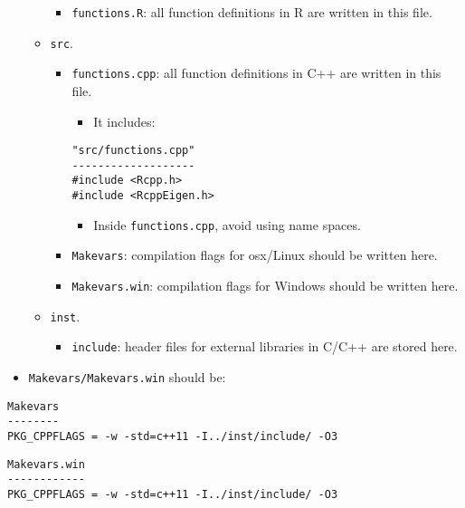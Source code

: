 \documentclass[
]{book}
\providecommand{\tightlist}{%
  \setlength{\itemsep}{0pt}\setlength{\parskip}{0pt}}
\begin{document}
\begin{itemize}
\begin{itemize}
    \begin{itemize}
    \tightlist
    \item
      \texttt{functions.R}: all function definitions in R are written in this file.
    \end{itemize}
  \item
    \texttt{src}.

    \begin{itemize}
    \tightlist
    \item
      \texttt{functions.cpp}: all function definitions in C++ are written in this file.

      \begin{itemize}
      \tightlist
      \item
        It includes:
      \end{itemize}

\begin{verbatim}
"src/functions.cpp"
-------------------
#include <Rcpp.h>
#include <RcppEigen.h>
\end{verbatim}

      \begin{itemize}
      \tightlist
      \item
        Inside \texttt{functions.cpp}, avoid using name spaces.
      \end{itemize}
    \item
      \texttt{Makevars}: compilation flags for osx/Linux should be written here.
    \item
      \texttt{Makevars.win}: compilation flags for Windows should be written here.
    \end{itemize}
  \item
    \texttt{inst}.

    \begin{itemize}
    \tightlist
    \item
      \texttt{include}: header files for external libraries in C/C++ are stored here.
    \end{itemize}
  \end{itemize}
\item
  \texttt{Makevars/Makevars.win} should be:
\end{itemize}

\begin{verbatim}
Makevars
--------
PKG_CPPFLAGS = -w -std=c++11 -I../inst/include/ -O3
\end{verbatim}

\begin{verbatim}
Makevars.win
------------
PKG_CPPFLAGS = -w -std=c++11 -I../inst/include/ -O3
\end{verbatim}
\end{document}

